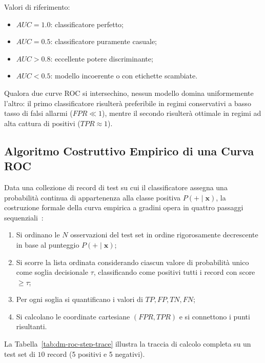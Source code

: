 Valori di riferimento:
\begin{itemize}
    \item $AUC = 1.0$: classificatore perfetto;
    \item $AUC = 0.5$: classificatore puramente casuale;
    \item $AUC > 0.8$: eccellente potere discriminante;
    \item $AUC < 0.5$: modello incoerente o con etichette scambiate.
\end{itemize}

Qualora due curve ROC si intersechino, nessun modello domina uniformemente l'altro: il primo classificatore risulterà preferibile in regimi conservativi a basso tasso di falsi allarmi ($FPR \ll 1$), mentre il secondo risulterà ottimale in regimi ad alta cattura di positivi ($TPR \approx 1$).

\FloatBarrier
\subsection{Algoritmo Costruttivo Empirico di una Curva ROC}
\label{subsec:dm-roc-construction-algorithm}

Data una collezione di record di test su cui il classificatore assegna una probabilità continua di appartenenza alla classe positiva $P(+ \mid \mathbf{x})$, la costruzione formale della curva empirica a gradini opera in quattro passaggi sequenziali~\cite{tan2018, fawcett2006}:
\begin{enumerate}
    \item Si ordinano le $N$ osservazioni del test set in ordine rigorosamente decrescente in base al punteggio $P(+ \mid \mathbf{x})$;
    \item Si scorre la lista ordinata considerando ciascun valore di probabilità unico come soglia decisionale $\tau$, classificando come positivi tutti i record con score $\ge \tau$;
    \item Per ogni soglia si quantificano i valori di $TP, FP, TN, FN$;
    \item Si calcolano le coordinate cartesiane $(FPR, TPR)$ e si connettono i punti risultanti.
\end{enumerate}

La Tabella~\ref{tab:dm-roc-step-trace} illustra la traccia di calcolo completa su un test set di $10$ record (5 positivi e 5 negativi).

